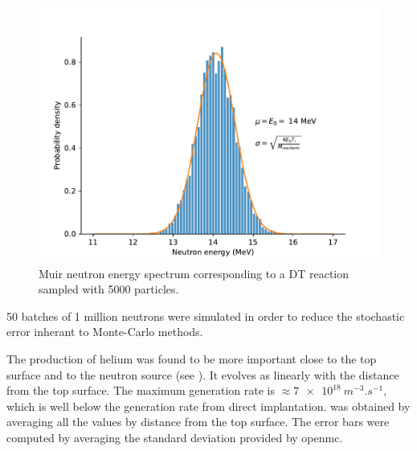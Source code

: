 \begin{figure}
    \includegraphics[width=\linewidth]{Figures/Chapter5/DT_neutron_source.pdf}
    \caption{Muir neutron energy spectrum corresponding to a DT reaction sampled with 5000 particles.}
\end{figure}

50 batches of 1 million neutrons were simulated in order to reduce the stochastic error inherant to Monte-Carlo methods.

The production of helium was found to be more important close to the top surface and to the neutron source (see ).
It evolves as linearly with the distance from the top surface.
The maximum generation rate is $\approx \SI{7e18}{m^{-3}.s^{-1}}$, which is well below the generation rate from direct implantation.
 was obtained by averaging all the values by distance from the top surface.
The error bars were computed by averaging the standard deviation provided by \gls{openmc}.

